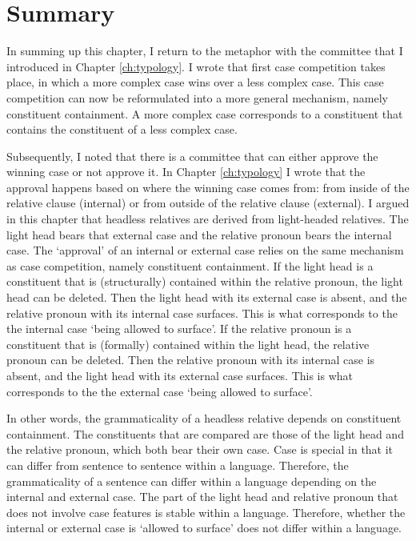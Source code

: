\section{Summary}

In summing up this chapter, I return to the metaphor with the committee that I introduced in Chapter \ref{ch:typology}. I wrote that first case competition takes place, in which a more complex case wins over a less complex case. This case competition can now be reformulated into a more general mechanism, namely constituent containment. A more complex case corresponds to a constituent that contains the constituent of a less complex case.

Subsequently, I noted that there is a committee that can either approve the winning case or not approve it. In Chapter \ref{ch:typology} I wrote that the approval happens based on where the winning case comes from: from inside of the relative clause (internal) or from outside of the relative clause (external). I argued in this chapter that headless relatives are derived from light-headed relatives. The light head bears that external case and the relative pronoun bears the internal case. The `approval' of an internal or external case relies on the same mechanism as case competition, namely constituent containment.
If the light head is a constituent that is (structurally) contained within the relative pronoun, the light head can be deleted. Then the light head with its external case is absent, and the relative pronoun with its internal case surfaces. This is what corresponds to the the internal case `being allowed to surface'.
If the relative pronoun is a constituent that is (formally) contained within the light head, the relative pronoun can be deleted. Then the relative pronoun with its internal case is absent, and the light head with its external case surfaces. This is what corresponds to the the external case `being allowed to surface'.

In other words, the grammaticality of a headless relative depends on constituent containment. The constituents that are compared are those of the light head and the relative pronoun, which both bear their own case. Case is special in that it can differ from sentence to sentence within a language. Therefore, the grammaticality of a sentence can differ within a language depending on the internal and external case. The part of the light head and relative pronoun that does not involve case features is stable within a language. Therefore, whether the internal or external case is `allowed to surface' does not differ within a language.

